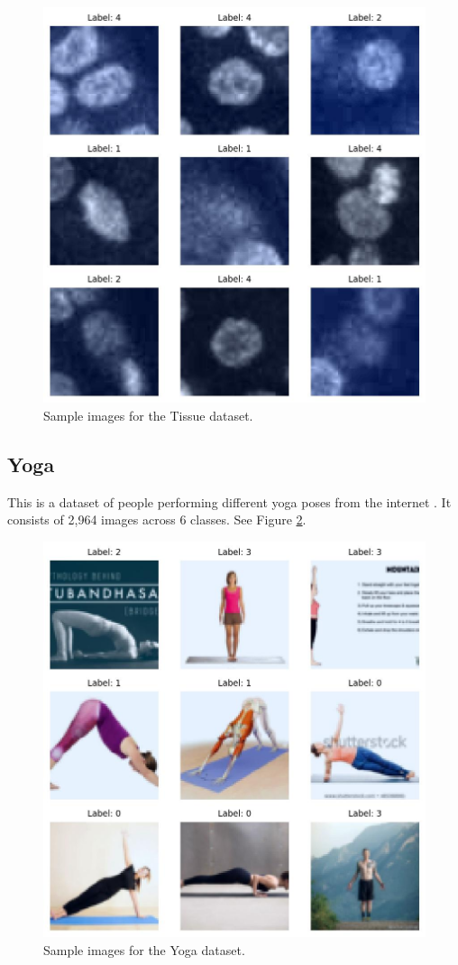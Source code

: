 \documentclass[letterpaper]{article} %
\theoremstyle{plain}
\theoremstyle{definition}
\theoremstyle{remark}
\begin{document}
\begin{figure}[htbp]
    \centering
    \includegraphics[width=\columnwidth]{../../images/tissue_1_sample.jpg}
    \caption{Sample images for the Tissue dataset.}
    \label{fig:tissue}
\end{figure}



\subsection{Yoga} This is a dataset of people performing different yoga poses from the internet \citep{yoga_data}. It consists of 2,964 images across 6 classes. See Figure \ref{fig:yoga}.

\begin{figure}[htbp]
    \centering
    \includegraphics[width=\columnwidth]{../../images/yoga_1_sample.jpg}
    \caption{Sample images for the Yoga dataset.}
    \label{fig:yoga}
\end{figure}
\end{document}
